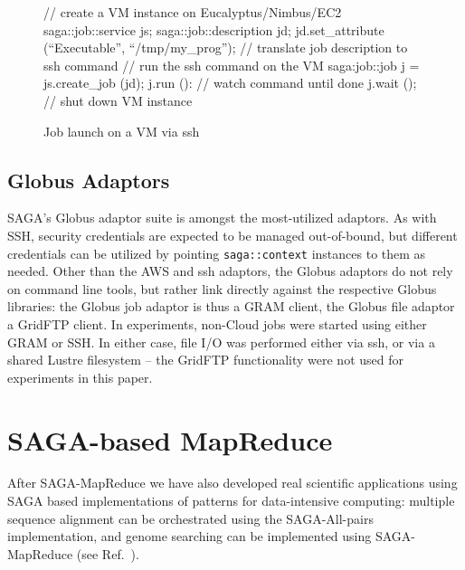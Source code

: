 \documentclass[conference,final]{IEEEtran}
\newcommand{\jhanote}[1]{ {\textcolor{red} { ***SJ: #1 }}}
\newcommand{\jhanote}[1]{}
\newcommand{\sagamapreduce }{SAGA-MapReduce }
\newcommand{\upup}{\vspace*{-0.6em}}
\newcommand{\upp}{\vspace*{-0.6em}}
\newcommand{\T}[1]{\texttt{#1}}
\begin{document}
\begin{figure}[!ht]
\upp
 \begin{center}
  \begin{mycode}[label=SAGA create a VM instance on a Cloud]
   {// create a VM instance on Eucalyptus/Nimbus/EC2
    saga::job::service     js;
    saga::job::description jd;
    jd.set_attribute (``Executable'', ``/tmp/my_prog'');
    // translate job description to ssh command
    // run the ssh command on the VM
    saga:job::job j = js.create_job (jd);
    j.run ():
    // watch command until done
    j.wait ();
   } // shut down VM instance
  \end{mycode}
  \caption{\label{vmjob} Job launch on a VM via ssh\vspace*{-2em}}
 \end{center}
\upp
\end{figure}

\upup
\upup
\subsection{Globus Adaptors}
SAGA's Globus adaptor suite is amongst the most-utilized adaptors.  As
with SSH, security credentials are expected to be managed
out-of-bound, but different credentials can be utilized by pointing
\T{saga::context} instances to them as needed.  Other than the AWS and
ssh adaptors, the Globus adaptors do not rely on command line tools,
but rather link directly against the respective Globus libraries: the
Globus job adaptor is thus a GRAM client, the Globus file adaptor a
GridFTP client.  In experiments, non-Cloud jobs were started using
either GRAM or SSH.  In either case, file I/O was performed either via
ssh, or via a shared Lustre filesystem -- the GridFTP functionality
were not used for experiments in this paper.



\upup
\section{SAGA-based MapReduce}
After \sagamapreduce we have also developed real scientific
applications using SAGA based implementations of patterns for
data-intensive computing: multiple sequence alignment can be
orchestrated using the SAGA-All-pairs implementation, and genome
searching can be implemented using SAGA-MapReduce (see
Ref.~\cite{saga_ccgrid09}).
\end{document}
